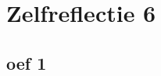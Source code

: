 \documentclass[lineaire_algebra_oplossingen.tex]{subfiles}
\begin{document}
\section{Zelfreflectie 6}
\subsection{oef 1}
\end{document}
